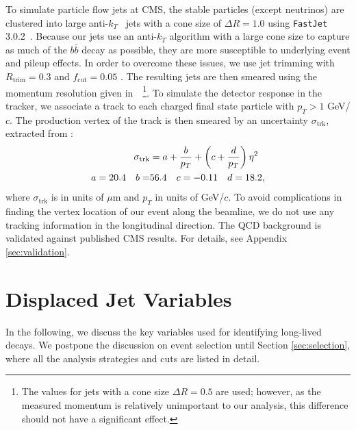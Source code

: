 \documentclass{JHEP3}
\newcommand{\trk}{\textrm{trk}}
\begin{document}
To simulate particle flow jets at CMS, the stable particles (except neutrinos) are clustered into large anti-$k_{T}$~\cite{Cacciari:2008gp} jets
with a cone size of $\Delta R=1.0$ using \texttt{FastJet} 3.0.2~\cite{Cacciari:2011ma}. Because our jets use an anti-$k_{T}$ algorithm with a large cone size to capture as much of the $b\bar{b}$ decay as possible, they are more susceptible to underlying event and pileup
effects. In order to overcome these issues, we use jet trimming with $R_{\textrm{trim}}=0.3$ and
$f_{\textrm{cut}}=0.05$ \cite{Krohn:2009th}. The resulting jets are then smeared
using the momentum resolution given in~\cite{CMS:2009nxa}~\footnote{The values for jets with a cone size
$\Delta R=0.5$ are used; however, as the measured momentum is relatively unimportant to our analysis, this
difference should not have a significant effect.}. To simulate the detector response in the tracker, we associate a track to each charged final state particle with $p_{T} > 1$ GeV/$c$. The production vertex of the track is then smeared by an uncertainty $\sigma_{\trk}$,
extracted from \cite{CMS:2010wta}:
\begin{align}
\label{eqn:sigma}
\sigma_{\trk}&=a+\frac{b}{p_{T}}+\left(c+\frac{d}{p_{T}}\right)\eta^2 \\
a=20.4 \quad b=&56.4 \quad c=-0.11 \quad d=18.2, \notag
\end{align}
where $\sigma_{\trk}$ is in units of $\mu$m and $p_{T}$ in units of GeV/$c$. To avoid complications in finding
the vertex location of our event along the beamline, we do not use any tracking information in the longitudinal
direction. The QCD background is validated against published CMS
results. For details, see Appendix \ref{sec:validation}. 

\section{Displaced Jet Variables}
\label{sec:djet}
In the following, we discuss the key variables used for identifying long-lived decays. We postpone the discussion on event
selection until Section \ref{sec:selection}, where all the analysis strategies and cuts are listed in detail.
\end{document}
